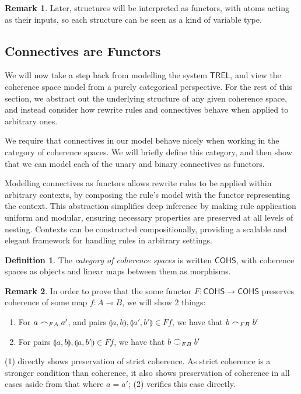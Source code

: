 \documentclass[11pt, oneside]{article}
\theoremstyle{plain}
\theoremstyle{definition}
\newtheorem{definition}[theorem]{Definition}
\newtheorem*{remark}{Remark}
\newcommand{\lp}{\llparenthesis}
\newcommand{\rp}{\rrparenthesis}
\newcommand{\sSys}{{\mathsf{TREL}}}%
\newcommand{\cohs}{{\mathsf{COHS}}}
\newcommand{\coh}[1][]{\mathrel{\vcenter{\offinterlineskip\hbox{$\frown$}\vskip0.2ex\hbox{$\smile$}}_{\ifx\\#1\\\else#1\fi}}}
\newcommand{\scoh}[1][]{\mathrel{\frown}_{\ifx\\#1\\\else#1\fi}}
\begin{document}
\begin{remark}
    Later, structures will be interpreted as functors, with atoms acting as their inputs, so each structure can be seen as a kind of variable type.
\end{remark}

\subsection{Connectives are Functors}

We will now take a step back from modelling the system $\sSys$, and view the coherence space model from a purely categorical perspective.
For the rest of this section, we abstract out the underlying structure of any given coherence space, and instead consider how rewrite rules and connectives behave when applied to arbitrary ones.

We require that connectives in our model behave nicely when working in the category of coherence spaces.
We will briefly define this category, and then show that we can model each of the unary and binary connectives as functors.

Modelling connectives as functors allows rewrite rules to be applied within arbitrary contexts, by composing the rule's model with the functor representing the context.
This abstraction simplifies deep inference by making rule application uniform and modular, ensuring necessary properties are preserved at all levels of nesting.
Contexts can be constructed compositionally, providing a scalable and elegant framework for handling rules in arbitrary settings.

\begin{definition}
    The \textit{category of coherence spaces} is written $\cohs$, with coherence spaces as objects and linear maps between them as morphisms.
\end{definition}

\begin{remark}
In order to prove that the some functor $F:\cohs\to\cohs$ preserves coherence of some map $f:A\multimap B$, we will show 2 things:
\begin{enumerate}
    \item
    For $a\scoh[FA]a'$, and pairs $\lp a,b\rp,\lp a',b'\rp\in Ff$, we have that $b\scoh[FB]b'$
    \item 
    For pairs $\lp a,b\rp,\lp a,b'\rp\in Ff$, we have that $b\coh[FB]b'$
\end{enumerate}
(1) directly shows preservation of strict coherence. As strict coherence is a stronger condition than coherence, it also shows preservation of coherence in all cases aside from that where $a=a'$;
(2) verifies this case directly.
\end{remark}
\end{document}
